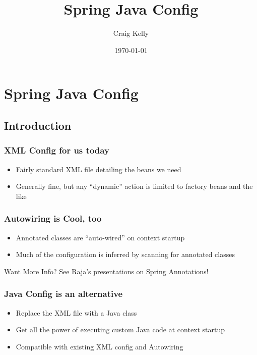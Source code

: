 \documentclass[t,handout]{beamer}
\title{Spring Java Config}
\author{Craig Kelly}
\date{\today}
\begin{document}
\frame{\titlepage}

\section{Spring Java Config}
    
    \subsection{Introduction}
        \frame
        {
          \frametitle{XML Config for us today}
          \begin{itemize}
          \item Fairly standard XML file detailing the beans we need
          \item Generally fine, but any ``dynamic'' action is limited to
                factory beans and the like
          \end{itemize}
          {\tiny 
            
          }
        }

        \frame
        {
            \frametitle{Autowiring is Cool, too}
            \begin{itemize}
                \item Annotated classes are ``auto-wired'' on context startup
                \item Much of the configuration is inferred by scanning for annotated classes
            \end{itemize}
            \begin{block}{Want More Info?}
                See Raja's presentations on Spring Annotations!
            \end{block}
        }
        
        \frame
        {
          \frametitle{Java Config is an alternative}
          \begin{itemize}
          \item Replace the XML file with a Java class
          \item Get all the power of executing custom Java code at context startup
          \item Compatible with existing XML config and Autowiring
          \end{itemize}
          {\tiny 
            
          }
        }
    
\end{document}
